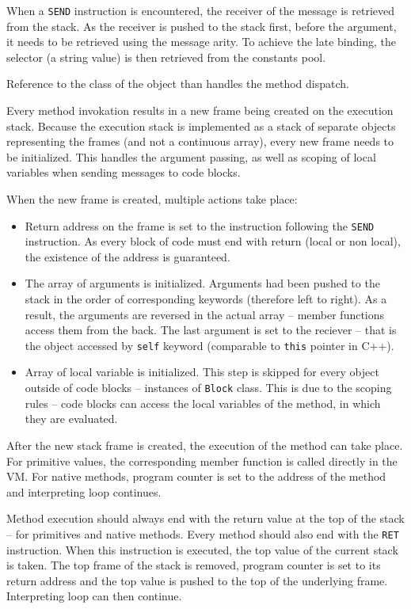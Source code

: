 \documentclass[thesis=M,english]{FITthesis}[2019/12/23]
\begin{document}
When a \texttt{SEND} instruction is encountered, the receiver of the message is retrieved from the stack. As the receiver is pushed to the stack
first, before the argument, it needs to be retrieved using the message arity. To achieve the late binding, the selector (a string value)
is then retrieved from the constants pool. 

Reference to the class of the object than handles the method dispatch.

Every method invokation results in a new frame being created on the execution stack. Because the execution stack is implemented as a
stack of separate objects representing the frames (and not a continuous array), every new frame needs to be initialized. This handles
the argument passing, as well as scoping of local variables when sending messages to code blocks.

When the new frame is created, multiple actions take place:
\begin{itemize}
	\item Return address on the frame is set to the instruction following the \texttt{SEND} instruction. As every block of code must end
		with return (local or non local), the existence of the address is guaranteed.
	\item The array of arguments is initialized. Arguments had been pushed to the stack in the order of corresponding keywords (therefore
		left to right). As a result, the arguments are reversed in the actual array -- member functions access them from the back. The
		last argument is set to the reciever -- that is the object accessed by \texttt{self} keyword (comparable to \texttt{this} pointer in
		C++).
	\item Array of local variable is initialized. This step is skipped for every object outside of code blocks -- instances of \texttt{Block}
		class. This is due to the scoping rules -- code blocks can access the local variables of the method, in which they are evaluated.
\end{itemize}

After the new stack frame is created, the execution of the method can take place. For primitive values, the corresponding member function
is called directly in the VM. For native methods, program counter is set to the address of the method and interpreting loop continues.

Method execution should always end with the return value at the top of the stack -- for primitives and native methods. Every method
should also end with the \texttt{RET} instruction. When this instruction is executed, the top value of the current stack is taken.
The top frame of the stack is removed, program counter is set to its return address and the top value is pushed to the top of the
underlying frame. Interpreting loop can then continue.
\end{document}
